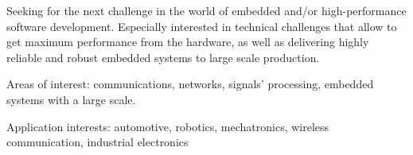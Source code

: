 


\begin{cventries}


\begin{flushleft}

Seeking for the next challenge in the world of embedded and/or high-performance software development. 
Especially interested in technical challenges that allow to get maximum performance from the hardware,
as well as delivering highly reliable and robust embedded systems to large scale production.
\newline

Areas of interest: communications, networks, signals' processing, embedded systems with a large scale. 
\newline

Application interests: automotive, robotics, mechatronics, wireless communication, industrial electronics
\end{flushleft}


\end{cventries}